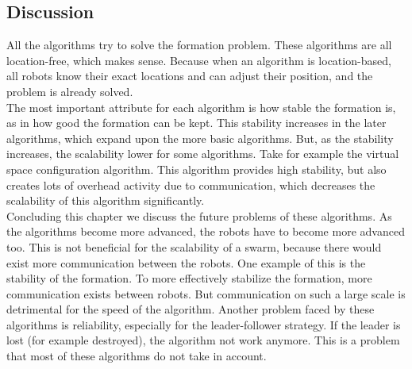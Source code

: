 \subsection{Discussion}
  \begin{table}[H]
  \renewcommand{\arraystretch}{1.3}
  \label{table_alg_formation}
  \centering
{}
  \caption{Overview of Formation Algorithms}
  \end{table}
All the algorithms try to solve the formation problem. 
These algorithms are all location-free, which makes sense.  
Because when an algorithm is location-based, all robots know their exact locations and can adjust their position, and the problem is already solved. \\
The most important attribute for each algorithm is how stable the formation is, as in how good the formation can be kept. 
This stability increases in the later algorithms, which expand upon the more basic algorithms. 
But, as the stability increases, the scalability lower for some algorithms. 
Take for example the virtual space configuration algorithm. 
This algorithm provides high stability, but also creates lots of overhead activity due to communication, which decreases the scalability of this algorithm significantly.\\

Concluding this chapter we discuss the future problems of these algorithms. 
As the algorithms become more advanced, the robots have to become more advanced too.
This is not beneficial for the scalability of a swarm, because there would exist more communication between the robots. 
One example of this is the stability of the formation. 
To more effectively stabilize the formation, more communication exists between robots. 
But communication on such a large scale is detrimental for the speed of the algorithm. 
Another problem faced by these algorithms is reliability, especially for the leader-follower strategy. 
If the leader is lost (for example destroyed), the algorithm   not work anymore. 
This is a problem that most of these algorithms do not take in account.  
